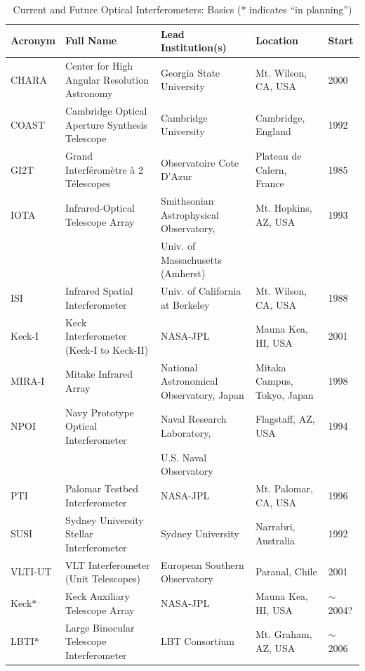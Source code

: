 \documentclass[12pt]{article}
\begin{document}
\begin{landscape}
\begin{table}

\footnotesize
\caption {Current and Future Optical Interferometers: Basics
($\ast$ indicates ``in planning'')
\label{table:all_interferometers}}
\begin{center}

\begin{tabular}{|l|l|l|l|l|}
\hline
\footnotesize
Acronym & Full Name & Lead Institution(s) & Location & Start \\
\hline
CHARA & Center for High Angular Resolution Astronomy & Georgia State University &
 Mt. Wilson, CA, USA & 2000\\
COAST & Cambridge Optical Aperture Synthesis Telescope & Cambridge University & 
Cambridge, England & 1992 \\
GI2T & Grand Interf{\' e}rom{\` e}tre {\` a} 2 T{\' e}lescopes & Observatoire Cote D'Azur  &
Plateau de Calern, France & 1985 \\
IOTA & Infrared-Optical Telescope Array & Smithsonian Astrophysical Observatory, &
Mt. Hopkins, AZ, USA & 1993 \\
 & & Univ. of Massachusetts (Amherst) & & \\
ISI & Infrared Spatial Interferometer & Univ. of California at Berkeley & Mt. Wilson, CA, USA &
1988 \\
Keck-I & Keck Interferometer (Keck-I to Keck-II) & NASA-JPL & Mauna Kea, HI, USA & 2001 \\
MIRA-I & Mitake Infrared Array & National Astronomical Observatory, Japan & Mitaka Campus,
Tokyo, Japan & 1998 \\ 
NPOI & Navy Prototype Optical Interferometer & Naval Research Laboratory, &
Flagstaff, AZ, USA & 1994 \\
 & & U.S. Naval Observatory & & \\
PTI & Palomar Testbed Interferometer & NASA-JPL & Mt. Palomar, CA, USA & 1996 \\
SUSI & Sydney University Stellar Interferometer & Sydney University & Narrabri, Australia & 1992 \\
VLTI-UT & VLT Interferometer (Unit Telescopes) & European Southern Observatory & Paranal, Chile & 2001 \\
\hline
Keck$\ast$ & Keck Auxiliary Telescope Array & NASA-JPL & Mauna Kea, HI, USA & $\sim$2004? \\
LBTI$\ast$ & Large Binocular Telescope Interferometer& LBT Consortium & Mt. Graham, AZ, USA & $\sim$2006 \\

\end{tabular}
\end{center}
\end{table}
\end{landscape}
\end{document}
